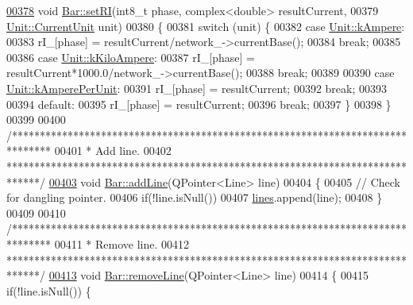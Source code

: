 \begin{DoxyCode}
\hypertarget{bar_8cpp_source_l00378}{}\hyperlink{group___models_gaf7a406f8952b1e874c95c41b0955d250}{00378} \textcolor{keywordtype}{void} \hyperlink{group___models_gaf7a406f8952b1e874c95c41b0955d250}{Bar::setRI}(int8\_t phase, complex<double> resultCurrent,
00379                 \hyperlink{class_unit_a0794cf6c9682f48296dd4a5315389787}{Unit::CurrentUnit} unit)
00380 \{
00381   \textcolor{keywordflow}{switch} (unit) \{
00382   \textcolor{keywordflow}{case} \hyperlink{class_unit_a0794cf6c9682f48296dd4a5315389787a368a3c470f0b590a6100dda717a7dd4f}{Unit::kAmpere}:
00383     rI\_[phase] = resultCurrent/network\_->currentBase();
00384     \textcolor{keywordflow}{break};
00385 
00386   \textcolor{keywordflow}{case} \hyperlink{class_unit_a0794cf6c9682f48296dd4a5315389787aa27cb5edd73099f24f2285e02396ae14}{Unit::kKiloAmpere}:
00387     rI\_[phase] = resultCurrent*1000.0/network\_->currentBase();
00388     \textcolor{keywordflow}{break};
00389 
00390   \textcolor{keywordflow}{case} \hyperlink{class_unit_a0794cf6c9682f48296dd4a5315389787aeed3b50e464d581cb630181a3b6a0709}{Unit::kAmperePerUnit}:
00391     rI\_[phase] = resultCurrent;
00392     \textcolor{keywordflow}{break};
00393 
00394   \textcolor{keywordflow}{default}:
00395     rI\_[phase] = resultCurrent;
00396     \textcolor{keywordflow}{break};
00397   \}
00398 \}
00399 
00400 \textcolor{comment}{/*******************************************************************************}
00401 \textcolor{comment}{ * Add line.}
00402 \textcolor{comment}{ ******************************************************************************/}
\hypertarget{bar_8cpp_source_l00403}{}\hyperlink{group___models_gabb1a3b7653d4e2327c4bf728210f197e}{00403} \textcolor{keywordtype}{void} \hyperlink{group___models_gabb1a3b7653d4e2327c4bf728210f197e}{Bar::addLine}(QPointer<Line> line)
00404 \{
00405   \textcolor{comment}{// Check for dangling pointer.}
00406   \textcolor{keywordflow}{if}(!line.isNull())
00407     \hyperlink{class_bar_a5aabf1f4ac22e20e9cb702a3a7e08eea}{lines}.append(line);
00408 \}
00409 
00410 \textcolor{comment}{/*******************************************************************************}
00411 \textcolor{comment}{ * Remove line.}
00412 \textcolor{comment}{ ******************************************************************************/}
\hypertarget{bar_8cpp_source_l00413}{}\hyperlink{group___models_gaec9faaf687415c27cd1d0527e1b94504}{00413} \textcolor{keywordtype}{void} \hyperlink{group___models_gaec9faaf687415c27cd1d0527e1b94504}{Bar::removeLine}(QPointer<Line> line)
00414 \{
00415   \textcolor{keywordflow}{if}(!line.isNull()) \{

\end{DoxyCode}
